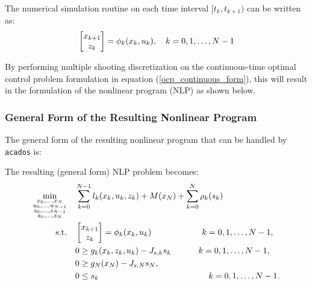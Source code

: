\documentclass{thesisreport}
\begin{document}
The numerical simulation routine on each time interval $[t_k, t_{k+1})$ can be written as:
    $$ \begin{bmatrix}
        x_{k+1}\\
        z_k\\
    \end{bmatrix} = \phi_k(x_k, u_k), \text{\space \space \space} k=0,1, \ldots, N-1$$   
 
By performing multiple shooting discretization on the continuous-time optimal control problem formulation in equation (\ref{ocp_continuous_form}), this will result in the formulation of the nonlinear program (NLP) as shown below.

\newpage

\subsubsection{General Form of the Resulting Nonlinear Program}

The general form of the resulting nonlinear program that can be handled by \texttt{acados} is:

The resulting (general form) NLP problem becomes:
    \begin{equation}\label{NLP}
        \begin{aligned}
        \min_{\substack{x_0,\ldots,x_N\\ u_0,\ldots, u_{N-1} \\ z_0,\ldots, z_{N-1}\\  s_0, \ldots, s_N}} \quad & \sum_{k=0}^{N-1}{l_k(x_k, u_k, z_k) + M(x_N) + \sum_{k=0}^N \rho_k(s_k)}\\
        \textrm{s.t.} \quad & \begin{bmatrix}
                                x_{k+1}\\
                                z_k\\
                                \end{bmatrix} = \phi_k(x_k, u_k) \text{ \hspace{2cm}} k=0,1, \ldots, N-1, \\
                            & 0 \geq g_k(x_k, z_k, u_k) - J_{s,k}s_k \text{\hspace{1.15cm}} k=0,1, \ldots, N-1, \\
                            & 0 \geq g_N(x_N) - J_{s,N}s_N, \\
                            & 0 \leq s_k \text{\hspace{4.6cm}} k=0,1, \ldots, N-1.
        \end{aligned}
    \end{equation}
    
\end{document}
